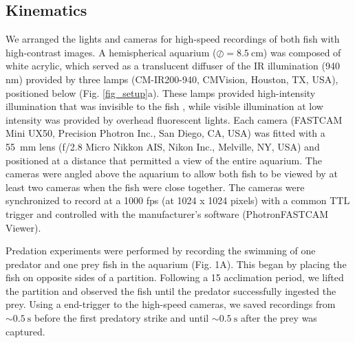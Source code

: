 \documentclass[]{rsos}%
\begin{document}
\subsection{Kinematics}
We arranged the lights and cameras for high-speed recordings of both fish with high-contrast images. 
A hemispherical aquarium ($\oslash = \SI{8.5}{\cm}$) was composed of white acrylic, which served as a translucent diffuser of the IR illumination (940 nm) provided by three lamps (CM-IR200-940, CMVision, Houston, TX, USA), positioned below (Fig. \ref{fig_setup}a). 
These lamps provided high-intensity illumination that was invisible to the fish \cite{Robinson:1993tu}, while visible illumination at low intensity was provided by overhead fluorescent lights.
Each camera (FASTCAM Mini UX50, Precision Photron Inc., San Diego, CA, USA) was fitted with a \SI{55}{\mm} lens (f/2.8 Micro Nikkon AIS, Nikon Inc., Melville, NY, USA) and positioned at a distance that permitted a view of the entire aquarium. 
The cameras were angled above the aquarium to allow both fish to be viewed by at least two cameras when the fish were close together.
The cameras were synchronized to record at a 1000 fps (at 1024 x 1024 pixels) with a common TTL trigger and controlled with the manufacturer's software (PhotronFASTCAM Viewer).

Predation experiments were performed by recording the swimming of one predator and one prey fish in the aquarium (Fig. 1A). 
This began by placing the fish on opposite sides of a partition.
Following a \SI{15}{\min} acclimation period, we lifted the partition and observed the fish until the predator successfully ingested the prey.
Using a end-trigger to the high-speed cameras, we saved recordings from $\sim \SI{0.5}{\s}$ before the first predatory strike and until $\sim \SI{0.5}{\s}$  after the prey was captured.
\end{document}
